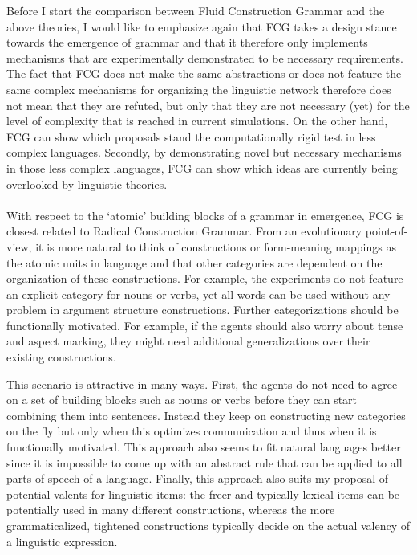 Before I start the comparison between Fluid Construction Grammar and the above theories, I would like to emphasize again that FCG takes a design stance towards the emergence of grammar and that it therefore only implements mechanisms that are experimentally demonstrated to be necessary requirements. The fact that FCG does not make the same abstractions or does not feature the same complex mechanisms for organizing the linguistic network therefore does not mean that they are refuted, but only that they are not necessary (yet) for the level of complexity that is reached in current simulations. On the other hand, FCG can show which proposals stand the computationally rigid test in less complex languages. Secondly, by demonstrating novel but necessary mechanisms in those less complex languages, FCG can show which ideas are currently being overlooked by linguistic theories.
\\
\\
 With respect to the `atomic' building blocks of a grammar in emergence, FCG is closest related to Radical Construction Grammar. From an evolutionary point-of-view, it is more natural to think of constructions or form-meaning mappings as the atomic units in language and that other categories are dependent on the organization of these constructions. For example, the experiments do not feature an explicit category for nouns or verbs, yet all words can be used without any problem in argument structure constructions. Further categorizations should be functionally motivated. For example, if the agents should also worry about tense and aspect marking, they might need additional generalizations over their existing constructions.

This scenario is attractive in many ways. First, the agents do not need to agree on a set of building blocks such as nouns or verbs before they can start combining them into sentences. Instead they keep on constructing new categories on the fly but only when this optimizes communication and thus when it is functionally motivated. This approach also seems to fit natural languages better since it is impossible to come up with an abstract rule that can be applied to all parts of speech of a language. Finally, this approach also suits my proposal of potential valents for linguistic items: the freer and typically lexical items can be potentially used in many different constructions, whereas the more grammaticalized, tightened constructions typically decide on the actual valency of a linguistic expression.

